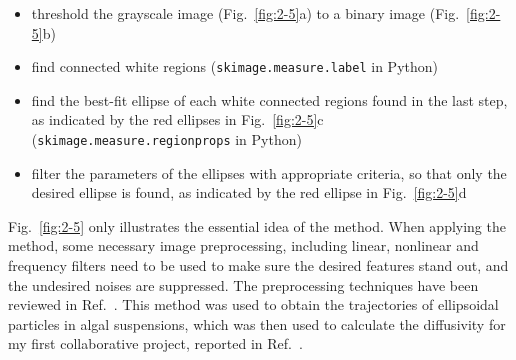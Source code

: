\begin{itemize}
	\item threshold the grayscale image (Fig.~\ref{fig:2-5}a) to a binary image (Fig.~\ref{fig:2-5}b)
	\item find connected white regions (\texttt{skimage.measure.label} in Python)
	\item find the best-fit ellipse of each white connected regions found in the last step, as indicated by the red ellipses in Fig.~\ref{fig:2-5}c (\texttt{skimage.measure.regionprops} in Python)
	\item filter the parameters of the ellipses with appropriate criteria, so that only the desired ellipse is found, as indicated by the red ellipse in Fig.~\ref{fig:2-5}d
\end{itemize}

Fig.~\ref{fig:2-5} only illustrates the essential idea of the method. When applying the method, some necessary image preprocessing, including linear, nonlinear and frequency filters need to be used to make sure the desired features stand out, and the undesired noises are suppressed. The preprocessing techniques have been reviewed in Ref.~\cite{Dorn2008, Rohr2010}. This method was used to obtain the trajectories of ellipsoidal particles in algal suspensions, which was then used to calculate the diffusivity for my first collaborative project, reported in Ref.~\cite{Yang2016}.

